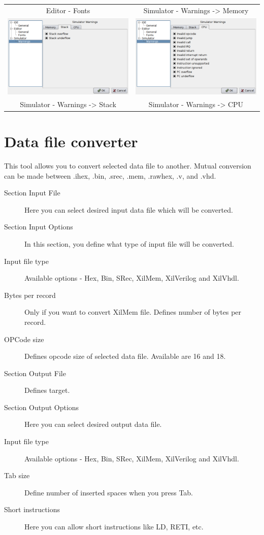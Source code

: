 \begin{table}[h!]
\begin{tabular}{cc}
                    \\
                Editor - Fonts & Simulator - Warnings -> Memory
                    \\
                \includegraphics[width=.4\textwidth]{img/interface5.png}
                    &
                \includegraphics[width=.4\textwidth]{img/interface6.png}
                    \\
                Simulator - Warnings -> Stack & Simulator - Warnings -> CPU
            \end{tabular}
        \end{table}

\clearpage
\section{Data file converter}
    This tool allows you to convert selected data file to another. Mutual conversion can be made between .ihex, .bin,
    .srec, .mem, .rawhex, .v, and .vhd.
    \begin{description}
        \item[Section Input File] Here you can select desired input data file which will be converted.
        \item[Section Input Options] In this section, you define what type of input file will be converted.
        \item[Input file type] Available options - Hex, Bin, SRec, XilMem, XilVerilog and XilVhdl.
        \item[Bytes per record] Only if you want to convert XilMem file. Defines number of bytes per record.
        \item[OPCode size] Defines opcode size of selected data file. Available are 16 and 18.
        \item[Section Output File] Defines target.
        \item[Section Output Options] Here you can select desired output data file.
        \item[Input file type] Available options - Hex, Bin, SRec, XilMem, XilVerilog and XilVhdl.
        \item[Tab size]  Define number of inserted spaces when you press Tab.
        \item[Short instructions] Here you can allow short instructions like LD, RETI, etc.
    \end{description}

